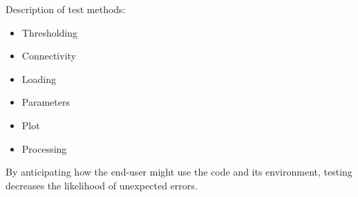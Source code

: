 \begin{enumerate}
Description of test methods:
        \begin{itemize}
            \item Thresholding
            \item Connectivity
            \item Loading
            \item Parameters
            \item Plot
            \item Processing
        \end{itemize}

By anticipating how the end-user might use the code and its environment, testing decreases the likelihood of unexpected errors. 



\end{enumerate}


